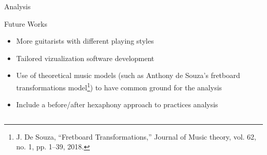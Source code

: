 \documentclass[final]{beamer}
\newlength{\sepwid}
\newlength{\onecolwid}
\begin{document}
\begin{frame}[t]
\begin{columns}[t]
\begin{column}{\onecolwid}
\begin{block}{Analysis}
    


\end{block}










\begin{alertblock}{Future Works}

\begin{itemize}
    \item More guitarists with different playing styles
    \item Tailored vizualization software development
    \item Use of theoretical music models (such as Anthony de Souza's fretboard transformations model\footnote{J. De Souza, “Fretboard Transformations,” Journal of
Music theory, vol. 62, no. 1, pp. 1–39, 2018.}) to have common ground for the analysis
    \item Include a before/after hexaphony approach to practices analysis
\end{itemize}

\end{alertblock} 






\end{column}
\end{columns}
\end{frame}
\end{document}
